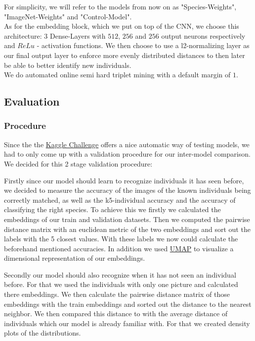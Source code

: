 \noindent For simplicity, we will refer to the models from now on as "Species-Weights", "ImageNet-Weights" and "Control-Model". \\
As for the embedding block, which we put on top of the CNN, we choose this architecture: 3 Dense-Layers with $512$, $256$ and $256$ output neurons respectively and $ReLu$ - activation functions. We then choose to use a l2-normalizing layer as our final output layer to enforce more evenly distributed distances to then later be able to better identify new individuals. \\
We do automated online semi hard triplet mining with a default margin of $1$.


\subsection{Evaluation}
\subsubsection{Procedure}
\noindent Since the the \hyperref[sec:kagglechallenge]{Kaggle Challenge} offers a nice automatic way of testing models, we had to only come up with a validation procedure for our inter-model comparison. We decided for this 2 stage validation procedure:




\noindent Firstly since our model should learn to recognize individuals it has seen before, we decided to measure the accuracy
of the images of the known individuals being correctly matched, as well as the k5-individual accuracy and the accuracy of classifying the right species. To achieve this we firstly we calculated the embeddings of our train and validation datasets. Then we computed the pairwise distance matrix with an euclidean metric of the two embeddings and sort out the labels with the 5 closest values. With these labels we now could calculate the beforehand mentioned accuracies. In addition we used \href{https://umap-learn.readthedocs.io/en/latest/basic_usage.html}{UMAP} to visualize a dimensional representation of our embeddings. 

\noindent Secondly our model should also recognize when it has not seen an individual before. For that we used the individuals with only one picture and calculated there embeddings. We then calculate the pairwise distance matrix of those embeddings with the train embeddings and sorted out the distance to the nearest neighbor. We then compared this distance to with the average distance of individuals which our model is already familiar with. For that we created density plots of the distributions.


